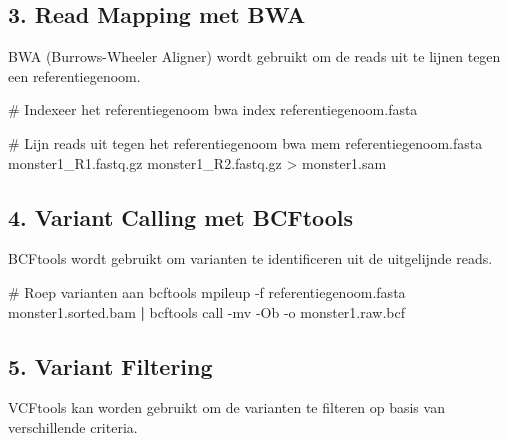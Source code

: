 \documentclass[
  letterpaper,
  DIV=11,
  numbers=noendperiod]{scrartcl}
\newenvironment{Shaded}{\begin{snugshade}}{\end{snugshade}}
\newcommand{\AttributeTok}[1]{\textcolor[rgb]{0.40,0.45,0.13}{#1}}
\newcommand{\CommentTok}[1]{\textcolor[rgb]{0.37,0.37,0.37}{#1}}
\newcommand{\ExtensionTok}[1]{\textcolor[rgb]{0.00,0.23,0.31}{#1}}
\newcommand{\KeywordTok}[1]{\textcolor[rgb]{0.00,0.23,0.31}{\textbf{#1}}}
\newcommand{\NormalTok}[1]{\textcolor[rgb]{0.00,0.23,0.31}{#1}}
\newcommand{\OperatorTok}[1]{\textcolor[rgb]{0.37,0.37,0.37}{#1}}
\begin{document}
\subsection{3. Read Mapping met BWA}\label{read-mapping-met-bwa}

BWA (Burrows-Wheeler Aligner) wordt gebruikt om de reads uit te lijnen
tegen een referentiegenoom.

\begin{Shaded}
\begin{Highlighting}[]
\CommentTok{\# Indexeer het referentiegenoom}
\ExtensionTok{bwa}\NormalTok{ index referentiegenoom.fasta}

\CommentTok{\# Lijn reads uit tegen het referentiegenoom}
\ExtensionTok{bwa}\NormalTok{ mem referentiegenoom.fasta monster1\_R1.fastq.gz monster1\_R2.fastq.gz }\OperatorTok{\textgreater{}}\NormalTok{ monster1.sam}
\end{Highlighting}
\end{Shaded}

\subsection{4. Variant Calling met
BCFtools}\label{variant-calling-met-bcftools}

BCFtools wordt gebruikt om varianten te identificeren uit de uitgelijnde
reads.

\begin{Shaded}
\begin{Highlighting}[]
\CommentTok{\# Roep varianten aan}
\ExtensionTok{bcftools}\NormalTok{ mpileup }\AttributeTok{{-}f}\NormalTok{ referentiegenoom.fasta monster1.sorted.bam }\KeywordTok{|} \ExtensionTok{bcftools}\NormalTok{ call }\AttributeTok{{-}mv} \AttributeTok{{-}Ob} \AttributeTok{{-}o}\NormalTok{ monster1.raw.bcf}
\end{Highlighting}
\end{Shaded}

\subsection{5. Variant Filtering}\label{variant-filtering}

VCFtools kan worden gebruikt om de varianten te filteren op basis van
verschillende criteria.
\end{document}

